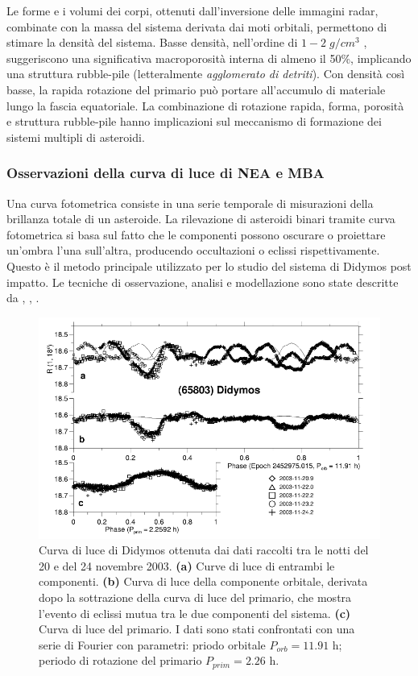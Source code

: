\documentclass[a4paper,11pt,openright]{book}
\begin{document}
Le forme e i volumi dei corpi, ottenuti dall'inversione delle immagini radar, combinate con la massa del sistema derivata dai moti orbitali, permettono di stimare la densità del sistema. Basse densità, nell'ordine di $1-2\;g/cm^3$ \citep{becker_physical_2015, brozovic_radar_2011}, suggeriscono una significativa macroporosità interna di almeno il 50\%, implicando una struttura rubble-pile (letteralmente \textit{agglomerato di detriti}). Con densità così basse, la rapida rotazione del primario può portare all'accumulo di materiale lungo la fascia equatoriale. La combinazione di rotazione rapida, forma, porosità e struttura rubble-pile hanno implicazioni sul meccanismo di formazione dei sistemi multipli di asteroidi.

\subsubsection{Osservazioni della curva di luce di NEA e MBA}
Una curva fotometrica consiste in una serie temporale di misurazioni della brillanza totale di un asteroide. La rilevazione di asteroidi binari tramite curva fotometrica si basa sul fatto che le componenti possono oscurare o proiettare un'ombra l'una sull'altra, producendo occultazioni o eclissi rispettivamente. Questo è il metodo principale utilizzato per lo studio del sistema di Didymos post impatto. Le tecniche di osservazione, analisi e modellazione sono state descritte da \citet{pravec_photometric_2006}, \citet{scheirich_modeling_2009}, \citet{scheirich_binary_2015}.

\begin{figure}[!h]
    \centering
    \includegraphics[scale=0.55]{figure/didymos_lightcurve.png}
    \caption[Curva di luce di (65803) Didymos.]{Curva di luce di Didymos ottenuta dai dati raccolti tra le notti del 20 e del 24 novembre 2003. \textbf{(a)} Curve di luce di entrambi le componenti. \textbf{(b)} Curva di luce della componente orbitale, derivata dopo la sottrazione della curva di luce del primario, che mostra l'evento di eclissi mutua tra le due componenti del sistema. \textbf{(c)} Curva di luce del primario. I dati sono stati confrontati con una serie di Fourier con parametri: priodo orbitale $P_{orb}=11.91$ h; periodo di rotazione del primario $P_{prim}=2.26$ h. \citep{pravec_photometric_2006}}
    \label{fig:didymos_lightcurve}
\end{figure}
\end{document}
